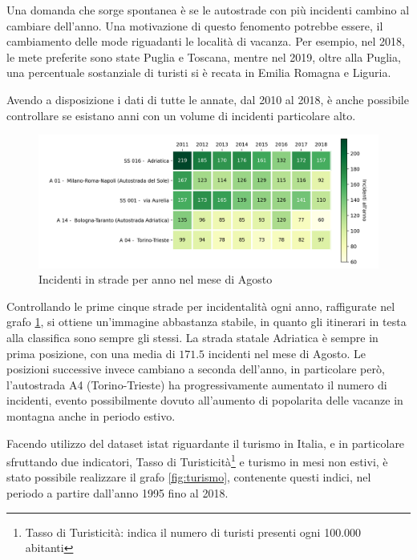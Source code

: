 \documentclass[a4paper]{report}
\begin{document}
Una domanda che sorge spontanea è se le autostrade con più incidenti 
cambino al cambiare dell'anno.
Una motivazione di questo fenomento potrebbe essere, il cambiamento 
delle mode riguadanti le località di vacanza.
Per esempio, nel 2018, le mete preferite sono state Puglia e 
Toscana\cite{INFOGRAFICA_ISTAT:1}, mentre nel 2019, oltre alla Puglia, 
una percentuale sostanziale di turisti si è recata in 
Emilia Romagna e Liguria\cite{REPORT_ISTAT_2019:1}.

Avendo a disposizione i dati di tutte le annate, dal 2010 al 2018, 
è anche possibile controllare se esistano anni con un volume di 
incidenti particolare alto.

\begin{figure}
    \includegraphics[width=\linewidth]{../src/incidenti/incidenti_aci/agosto/vacanze_autostrade.png}
    \caption{Incidenti in strade per anno nel mese di Agosto}
    \label{fig:autostrade-anno}
\end{figure}

Controllando le prime cinque strade per incidentalità ogni anno, 
raffigurate nel grafo \ref{fig:autostrade-anno}, si ottiene un'immagine 
abbastanza stabile, in quanto gli itinerari in testa alla classifica sono 
sempre gli stessi.
La strada statale Adriatica è sempre in prima posizione, con una media di $171.5$ 
incidenti nel mese di Agosto.
Le posizioni successive invece cambiano a seconda dell'anno, in particolare però, 
l'autostrada A4 (Torino-Trieste) ha progressivamente aumentato il numero di 
incidenti, evento possibilmente dovuto all'aumento di popolarita delle vacanze 
in montagna anche in periodo estivo.

Facendo utilizzo del dataset istat riguardante il turismo in Italia, e in 
particolare sfruttando due indicatori, Tasso di 
Turisticità\footnote{Tasso di Turisticità: indica il numero di turisti 
presenti ogni 100.000 abitanti\cite{ONTIT:1}} 
e turismo in mesi non estivi, è stato possibile realizzare il grafo \ref{fig:turismo}, 
contenente questi indici, nel periodo a partire dall'anno 1995 fino al 2018.
\end{document}
